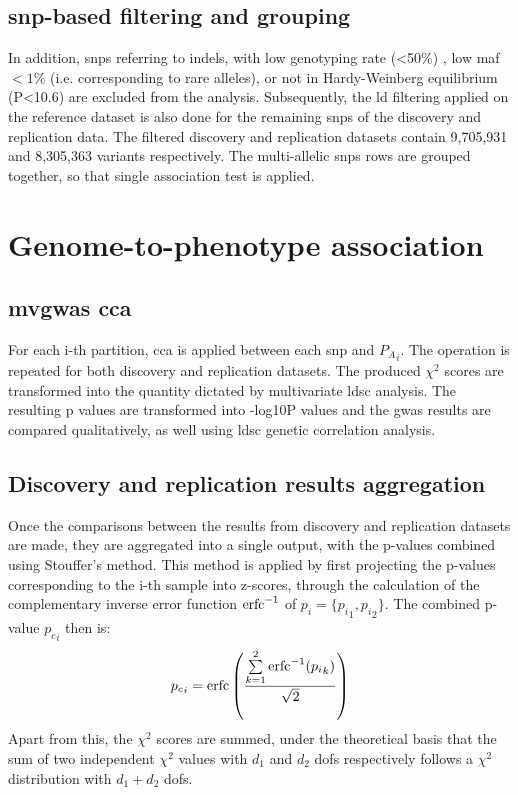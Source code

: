 \subsection{\ac{snp}-based filtering and grouping}
 In addition, \acp{snp} referring to indels, with low genotyping rate (<50\%) , low \ac{maf} $<1\%$ (i.e. corresponding to rare alleles), or not in Hardy-Weinberg equilibrium (P<10.6) are excluded from the analysis. Subsequently, the \ac{ld} filtering applied on the reference dataset is also done for the remaining \acp{snp} of the discovery and replication data. The filtered discovery and replication datasets contain 9,705,931 and 8,305,363 variants respectively. The multi-allelic \acp{snp} rows are grouped together, so that single association test is applied. 

\section{Genome-to-phenotype association}
\subsection{\ac{mvgwas} \ac{cca}}
For each i-th partition, \ac{cca} is applied between each \ac{snp} and ${P_A}_i$. The operation is repeated for both discovery and replication datasets. The produced $\chi^2$ scores are transformed into the quantity dictated by multivariate \ac{ldsc} analysis. The resulting p values are transformed into -log10P values and the \ac{gwas} results are compared qualitatively, as well using \ac{ldsc} genetic correlation analysis.

\subsection{Discovery and replication results aggregation}
Once the comparisons between the results from discovery and replication datasets are made, they are aggregated into a single output, with the p-values combined using Stouffer's method. This method is applied by first projecting the p-values corresponding to the i-th sample into z-scores, through the calculation of the complementary inverse error function $\operatorname*{erfc}^{-1}$ of $p_i=\{{p_i}_1,{p_i}_2\}$. The combined p-value ${p_c}_i$ then is:
$$
 {p_c}_i= \operatorname*{erfc}\left(\frac{\sum\limits_{k=1}^2 \operatorname*{erfc}^{-1}({p_i}_k)}{\sqrt{2}}\right)
$$
Apart from this, the $\chi^2$ scores are summed, under the theoretical basis that the sum of two independent $\chi^2$ values with $d_1$ and $d_2$ \acp{dof} respectively follows a $\chi^2$ distribution with $d_1+d_2$ \acp{dof}.

